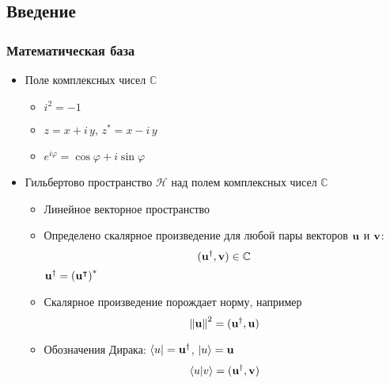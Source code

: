 \subsection{Введение}
\begin{frame}
    \frametitle{Математическая база}
    \begin{itemize}[<+->]
    \item
        Поле комплексных чисел $\mathbb{C}$
        \begin{itemize}[<+->]
        \item $i^2 = -1$
        \item $z = x + i\,y$, $z^\ast = x - i\, y$
        \item $e^{i \varphi} = \cos \varphi + i \sin \varphi$
        \end{itemize}
    \item
        Гильбертово пространство $\mathcal{H}$
        над полем комплексных чисел $\mathbb{C}$
        \begin{itemize}[<+->]
        \item Линейное векторное пространство
        \item
            Определено скалярное произведение для любой пары
            векторов $\bf{u}$ и $\bf{v}$:
            $$(\bf{u}^\dagger, \bf{v}) \in \mathbb{C}$$
            $\bf{u}^\dagger = \left(\bf{u}^\intercal \right)^\ast$
        \item
            Скалярное произведение порождает норму, например
            $$\left\lVert\bf{u}\right\rVert^2 = (\bf {u}^\dagger, \bf{u})$$
        \item Обозначения Дирака:
        $\bra{u} = \bf{u}^\dagger$, $\ket{u} = \bf{u}$
        $$\braket{u|v} = (\bf{u}^\dagger, \bf{v})$$
        \end{itemize}
    \end{itemize}
\end{frame}
